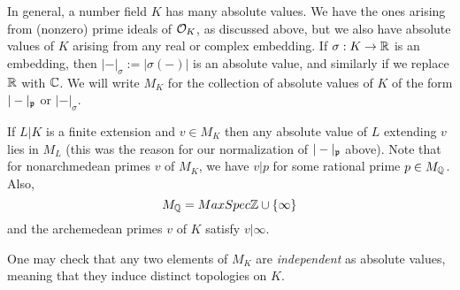 In general, a number field $K$ has many absolute values.
We have the ones arising from (nonzero) prime ideals of $\mathcal{O}_{K}$, as discussed above, but we also have absolute values of $K$ arising from any real or complex embedding.
If $\sigma : K \to \mathbb{R}$ is an embedding, then $|-|_{\sigma} := |\sigma(-)|$ is an absolute value, and similarly if we replace $\mathbb{R}$ with $\mathbb{C}$.
We will write $M_{K}$ for the collection of absolute values of $K$ of the form $|-|_{\mathfrak{p}}$ or $|-|_{\sigma}$.

If $L|K$ is a finite extension and $v \in M_{K}$ then any absolute value of $L$ extending $v$ lies in $M_{L}$ (this was the reason for our normalization of $|-|_{\mathfrak{p}}$ above).
Note that for nonarchmedean primes $v$ of $M_{K}$, we have $v|p$ for some rational prime $p \in M_{\mathbb{Q}}$.
Also,
\[ M_{\mathbb{Q}} = MaxSpec \mathbb{Z} \cup \{\infty\} \]
and the archemedean primes $v$ of $K$ satisfy $v|\infty$.

One may check that any two elements of $M_{K}$ are \emph{independent} as absolute values, meaning that they induce distinct topologies on $K$.

